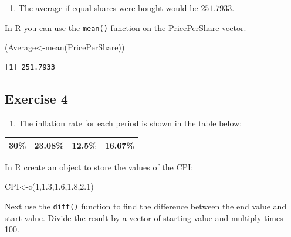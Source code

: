 \documentclass[
  letterpaper,
  DIV=11,
  numbers=noendperiod]{scrreprt}
\newenvironment{Shaded}{\begin{snugshade}}{\end{snugshade}}
\newcommand{\DecValTok}[1]{\textcolor[rgb]{0.68,0.00,0.00}{#1}}
\newcommand{\FloatTok}[1]{\textcolor[rgb]{0.68,0.00,0.00}{#1}}
\newcommand{\FunctionTok}[1]{\textcolor[rgb]{0.28,0.35,0.67}{#1}}
\newcommand{\NormalTok}[1]{\textcolor[rgb]{0.00,0.23,0.31}{#1}}
\newcommand{\OtherTok}[1]{\textcolor[rgb]{0.00,0.23,0.31}{#1}}
\providecommand{\tightlist}{%
  \setlength{\itemsep}{0pt}\setlength{\parskip}{0pt}}\usepackage{longtable,booktabs,array}
\begin{document}
\begin{enumerate}
\def\labelenumi{\arabic{enumi}.}
\setcounter{enumi}{1}
\tightlist
\item
  The average if equal shares were bought would be \(251.7933\).
\end{enumerate}

In R you can use the \texttt{mean()} function on the PricePerShare
vector.

\begin{Shaded}
\begin{Highlighting}[numbers=left,,]
\NormalTok{(Average}\OtherTok{\textless{}{-}}\FunctionTok{mean}\NormalTok{(PricePerShare))}
\end{Highlighting}
\end{Shaded}

\begin{verbatim}
[1] 251.7933
\end{verbatim}

\hypertarget{exercise-4-3}{%
\subsection*{Exercise 4}\label{exercise-4-3}}

\begin{enumerate}
\def\labelenumi{\arabic{enumi}.}
\tightlist
\item
  The inflation rate for each period is shown in the table below:
\end{enumerate}

\begin{longtable}[]{@{}cccc@{}}
\toprule()
\endhead
30\% & 23.08\% & 12.5\% & 16.67\% \\
\bottomrule()
\end{longtable}

In R create an object to store the values of the CPI:

\begin{Shaded}
\begin{Highlighting}[numbers=left,,]
\NormalTok{CPI}\OtherTok{\textless{}{-}}\FunctionTok{c}\NormalTok{(}\DecValTok{1}\NormalTok{,}\FloatTok{1.3}\NormalTok{,}\FloatTok{1.6}\NormalTok{,}\FloatTok{1.8}\NormalTok{,}\FloatTok{2.1}\NormalTok{)}
\end{Highlighting}
\end{Shaded}

Next use the \texttt{diff()} function to find the difference between the
end value and start value. Divide the result by a vector of starting
value and multiply times 100.
\end{document}
